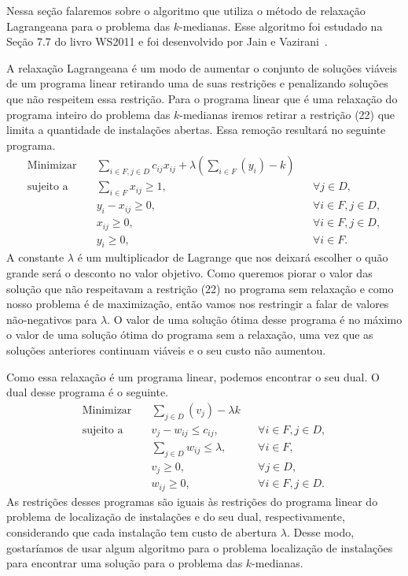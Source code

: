 Nessa seção falaremos sobre o algoritmo que utiliza o método de relaxação Lagrangeana para o problema das $k$-medianas. Esse algoritmo foi estudado na Seção 7.7 do livro WS2011 e foi desenvolvido por Jain e Vazirani~\cite{JV}.

A relaxação Lagrangeana é um modo de aumentar o conjunto de soluções viáveis de um programa linear retirando uma de suas restrições e penalizando soluções que não respeitem essa restrição. Para o programa linear que é uma relaxação do programa inteiro do problema das $k$-medianas iremos retirar a restrição (22) que limita a quantidade de instalações abertas. Essa remoção resultará no seguinte programa.
\begin{align}
    \text{Minimizar} \quad & \sum_{i \in F, j \in D} c_{ij}x_{ij} + \lambda \left(\sum_{i \in F} (y_i) - k\right) \\
    \text{sujeito a} \quad & \sum_{i \in F} x_{ij} \geq 1, &&\forall j \in D, \\
                           & y_i - x_{ij} \geq 0, &&\forall i \in F, j \in D, \\
                           & x_{ij} \geq 0, && \forall i \in F,j \in D, \\
                           & y_i \geq 0, &&\forall i \in F.
\end{align}
A constante $\lambda$ é um multiplicador de Lagrange que nos deixará escolher o quão grande será o desconto no valor objetivo.
Como queremos piorar o valor das solução que não respeitavam a restrição (22) no programa sem relaxação e como nosso problema é de maximização, então vamos nos restringir a falar de valores não-negativos para $\lambda$.
O valor de uma solução ótima desse programa é no máximo o valor de uma solução ótima do programa sem a relaxação, uma vez que as soluções anteriores continuam viáveis e o seu custo não aumentou.

Como essa relaxação é um programa linear, podemos encontrar o seu dual. O dual desse programa é o seguinte.
\begin{align*}
    \text{Minimizar} \quad & \sum_{j \in D} (v_j) - \lambda k \\
    \text{sujeito a} \quad & v_j - w_{ij} \leq c_{ij}, &&\forall i \in F, j\in D, \\
                           & \sum_{j\in D} w_{ij} \leq \lambda, &&\forall i \in F, \\
                           & v_j \geq 0, &&\forall j\in D, \\
                           & w_{ij} \geq 0, && \forall i \in F,j \in D.
\end{align*}
As restrições desses programas são iguais às restrições do programa linear do problema de localização de instalações e do seu dual, respectivamente, considerando que cada instalação tem custo de abertura $\lambda$.
Desse modo, gostaríamos de usar algum algoritmo para o problema localização de instalações para encontrar uma solução para o problema das $k$-medianas. 

